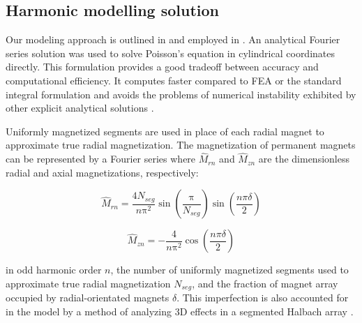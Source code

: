     
    \subsection{Harmonic modelling solution}               \label{Chapter:PMLSM design HM/electromagnetic model/hm solution}

                
        Our modeling approach is outlined in \cite{Ruddy2011} and employed in \cite{ruddy2014,Ruddy2015}. An analytical Fourier series solution was used to solve Poisson's equation in cylindrical coordinates directly. This formulation provides a good tradeoff between accuracy and computational efficiency. It computes faster compared to FEA \cite{Jin2014} or the standard integral formulation \cite{Wang1999,Bianchi2000} and avoids the problems of numerical instability exhibited by other explicit analytical solutions \cite{Wijono2010,Yan2013}.
        
        
        Uniformly magnetized segments are used in place of each radial magnet to approximate true radial magnetization. The magnetization of permanent magnets can be represented by a Fourier series where ${\hat M}_{rn}$ and  ${\hat M}_{zn}$ are the dimensionless radial and axial magnetizations, respectively:


        \begin{equation}
            {\hat M}_{rn}=\frac{4N_{seg}}{n\mathrm\pi^2}\sin\left(\frac{\mathrm\pi}{N_{seg}}\right)\sin\left(\frac{n\pi\delta}2\right)
            \label{eq:Mrn}
        \end{equation}
        
        
        \begin{equation}
            {\hat M}_{zn}=-\frac4{n\mathrm\pi^2}\cos\left(\frac{n\pi\delta}2\right)
            \label{eq:Mzn}
        \end{equation}
        
        
        in odd harmonic order $n$, the number of uniformly magnetized segments used to approximate true radial magnetization $N_{seg}$, and the fraction of magnet array occupied by radial-orientated magnets $\delta$. This imperfection is also accounted for in the model by a method of analyzing 3D effects in a segmented Halbach array \cite{Meessen2011}.


